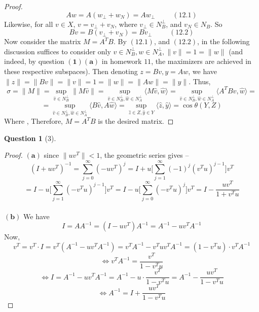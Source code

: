 \documentclass[11pt]{article}
\theoremstyle{quest}
\newtheorem*{question}{Question}
\begin{document}
\begin{proof}
$$Aw = A(w_{\perp} + w_N) = Aw_{\perp}\ \ \ \ \ \ \ \ \ \ \ (12.1)$$
Likewise, for all $v \in X$, $v = v_{\perp} + v_N$, where $v_{\perp} \in N_B^{\perp}$, and $v_N \in N_B$. So
$$Bv = B(v_{\perp} + v_N) = Bv_{\perp}\ \ \ \ \ \ \ \ \ \ \ (12.2)$$
Now consider the matrix $M = A^TB$. By $(12.1)$, and $(12.2)$, in the following discussion suffices to consider only $v \in N_B^{\perp}, w \in N_A^{\perp}, \|v\| = 1 = \|w\|$ (and indeed, by question $\mathbf{(1)(a)}$ in homework $11$, the maximizers are achieved in these respective subspaces). Then denoting $z= Bv, y = Aw$, we have $\|z\| = \|Bv\| = \|v\| = 1 = \|w\| = \|Aw\| = \|y\|$. Thus,
$$\sigma = \|M\| = \sup_{\hat{v} \in N_B^{\perp}} \|M\hat{v}\| = \sup_{\hat{v} \in N_B^{\perp},\hat{w} \in N_A^{\perp}} \langle M\hat{v}, \hat{w} \rangle = \sup_{\hat{v} \in N_B^{\perp},\hat{w} \in N_A^{\perp}} \langle A^TB \hat{v}, \hat{w} \rangle = $$ $$= \sup_{\hat{v} \in N_B^{\perp},\hat{w} \in N_A^{\perp}} \langle B \hat{v}, A \hat{w} \rangle = \sup_{\hat{z} \in Z, \hat{y} \in Y} \langle \hat{z}, \hat{y} \rangle = \cos \theta(Y, Z)$$
Where ,  Therefore, $M = A^TB$ is the desired matrix.
\end{proof}

\begin{question}[3]
\end{question}
\begin{proof}
$\mathbf{(a)}$ since $\|uv^T\| < 1$, the geometric series gives --
$$(I + uv^T)^{-1} = \sum_{j=0}^\infty (-uv^T)^j = I + u \Big[\sum_{j=1}^\infty (-1)^j(v^Tu)^{j-1}\Big] v^T$$
$$= I - u \Big[\sum_{j=1}^\infty (-v^Tu)^{j-1}\Big] v^T = I - u \Big[\sum_{j=0}^\infty (-v^Tu)^j\Big] v^T = I - \dfrac{uv^T}{1 + v^Tu}$$
\\$\mathbf{(b)}$ We have
$$I = AA^{-1} = (I - uv^T)A^{-1} = A^{-1} - uv^TA^{-1}$$
Now,
$$v^T = v^T \cdot I = v^T(A^{-1} - uv^TA^{-1}) = v^T A^{-1} - v^Tuv^TA^{-1} = (1 - v^Tu) \cdot v^TA^{-1}$$
$$\iff v^TA^{-1} = \dfrac{v^T}{1 - v^Tu}$$
$$\iff I = A^{-1} - uv^TA^{-1} = A^{-1} - u \cdot \dfrac{v^T}{1 - v^Tu} = A^{-1} - \dfrac{uv^T}{1 - v^Tu}$$
$$\iff A^{-1} = I + \dfrac{uv^T}{1 - v^Tu}$$
\end{proof}
\end{document}

